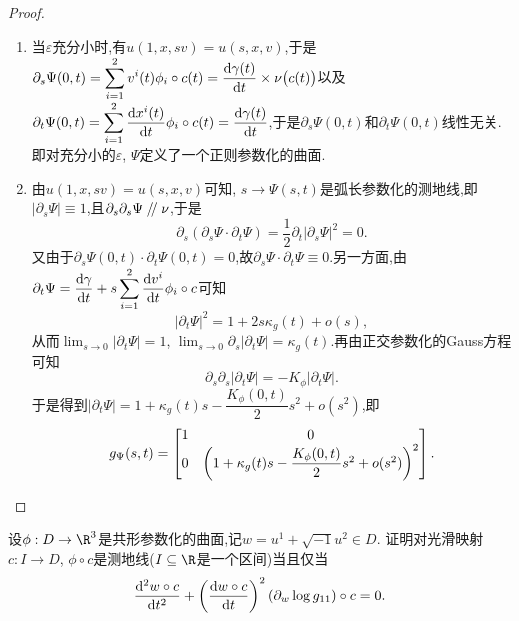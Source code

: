 	\begin{proof}
		\begin{enumerate}[label=(\roman*)]
			\item 当$\varepsilon$充分小时,有$u(1,x,sv)=u(s,x,v)$,于是$\displaystyle \partial_{s}\Psi(0,t)=\sum_{i=1}^{2}v^{i}(t)\phi_{i}\circ c(t)=\frac{\mathrm{d}\gamma(t)}{\mathrm{d} t}\times\nu\bigl(c(t)\bigr)$以及$\displaystyle \partial_{t}\Psi(0,t)=\sum_{i=1}^{2}\frac{\mathrm{d} x^{i}(t)}{\mathrm{d} t}\phi_{i}\circ c(t)=\frac{\mathrm{d}\gamma(t)}{\mathrm{d} t}$,于是$\partial_{s}\Psi(0,t)$和$\partial_{t}\Psi(0,t)$线性无关.即对充分小的$\varepsilon$, $\Psi$定义了一个正则参数化的曲面.
			\item 由$u(1,x,sv)=u(s,x,v)$可知, $s\to\Psi(s,t)$是弧长参数化的测地线,即$|\partial_{s}\Psi|\equiv 1$,且$\partial_{s}\partial_{s}\Psi\kern 0.56em/\kern -0.8em /\kern 0.56em \nu$,于是
			$$
			\partial_{s}(\partial_{s}\Psi\cdot\partial_{t}\Psi)=\frac{1}{2}\partial_{t}|\partial_{s}\Psi|^{2}=0.
			$$
			又由于$\partial_{s}\Psi(0,t)\cdot\partial_{t}\Psi(0,t)=0$,故$\partial_{s}\Psi\cdot\partial_{t}\Psi\equiv 0$.另一方面,由$\displaystyle \partial_{t}\Psi=\frac{\mathrm{d}\gamma}{\mathrm{d} t}+s\sum_{i=1}^{2}\frac{\mathrm{d} v^{i}}{\mathrm{d} t}\phi_{i}\circ c$可知
			$$
			|\partial_{t}\Psi|^{2}=1+2s\kappa_{g}(t)+o(s),
			$$
			从而$\displaystyle \lim_{s\to 0}|\partial_{t}\Psi|=1$, $\displaystyle \lim_{s\to 0}\partial_{s}|\partial_{t}\Psi|=\kappa_{g}(t)$.再由正交参数化的Gauss方程可知
			$$
			\partial_{s}\partial_{s}|\partial_{t}\Psi|=-K_{\phi}|\partial_{t}\Psi|.
			$$
			于是得到$|\partial_{t}\Psi|=1+\kappa_{g}(t)s-\dfrac{K_{\phi}(0,t)}{2}s^{2}+o(s^{2})$,即
			$$
			g_{\Psi}(s,t)=\begin{bmatrix}
				1&0\\
				0&\left( 1+\kappa_{g}(t)s-\dfrac{K_{\phi}(0,t)}{2}s^{2}+o(s^{2}) \right)^{2}
			\end{bmatrix}.\qedhere
			$$
		\end{enumerate}
	\end{proof}
	\begin{excise}
		设$\phi: D\to\R^{3}$是共形参数化的曲面,记$w=u^{1}+\sqrt{-1}u^{2}\in D$.
		证明对光滑映射$c:I\to D$, $\phi\circ c$是测地线($I\subseteq\R$是一个区间)当且仅当
		$$
		\frac{\mathrm{d}^{2}w\circ c}{\mathrm{d} t^{2}}+\left( \frac{\mathrm{d} w\circ c}{\mathrm{d} t} \right)^{2}(\partial_{w}\log g_{11})\circ c=0.
		$$
	\end{excise}
